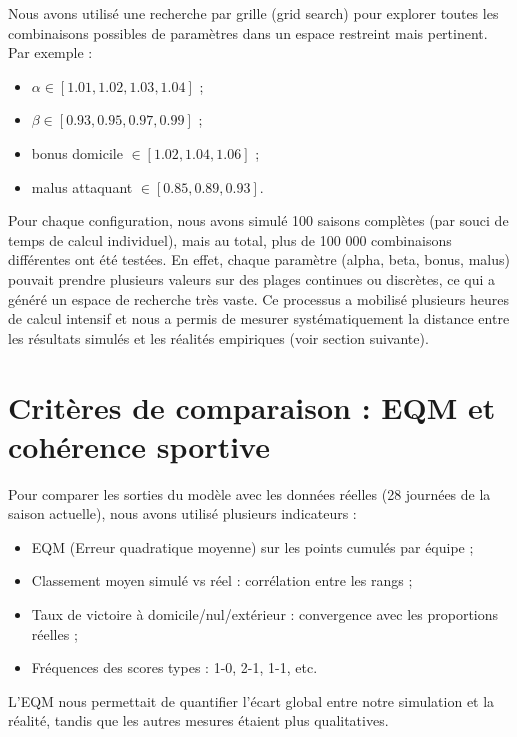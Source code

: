 \documentclass[12pt]{report}
\begin{document}
Nous avons utilisé une recherche par grille (grid search) pour explorer toutes les combinaisons possibles de paramètres dans un espace restreint mais pertinent. Par exemple :\\
\begin{itemize}
  \item $\alpha \in [1.01, 1.02, 1.03, 1.04]$ ;
  \item $\beta \in [0.93, 0.95, 0.97, 0.99]$ ;
  \item bonus domicile $\in [1.02, 1.04, 1.06]$ ;
  \item malus attaquant $\in [0.85, 0.89, 0.93]$.
\end{itemize}



Pour chaque configuration, nous avons simulé 100 saisons complètes (par souci de temps de calcul individuel), mais au total, plus de 100 000 combinaisons différentes ont été testées. En effet, chaque paramètre (alpha, beta, bonus, malus) pouvait prendre plusieurs valeurs sur des plages continues ou discrètes, ce qui a généré un espace de recherche très vaste. Ce processus a mobilisé plusieurs heures de calcul intensif et nous a permis de mesurer systématiquement la distance entre les résultats simulés et les réalités empiriques (voir section suivante).

\section{Critères de comparaison : EQM et cohérence sportive}

Pour comparer les sorties du modèle avec les données réelles (28 journées de la saison actuelle), nous avons utilisé plusieurs indicateurs :\\
\begin{itemize}
  \item EQM (Erreur quadratique moyenne) sur les points cumulés par équipe ;
  \item Classement moyen simulé vs réel : corrélation entre les rangs ;
  \item Taux de victoire à domicile/nul/extérieur : convergence avec les proportions réelles ;
  \item Fréquences des scores types : 1-0, 2-1, 1-1, etc.\\
\end{itemize}


L’EQM nous permettait de quantifier l’écart global entre notre simulation et la réalité, tandis que les autres mesures étaient plus qualitatives.
\end{document}
